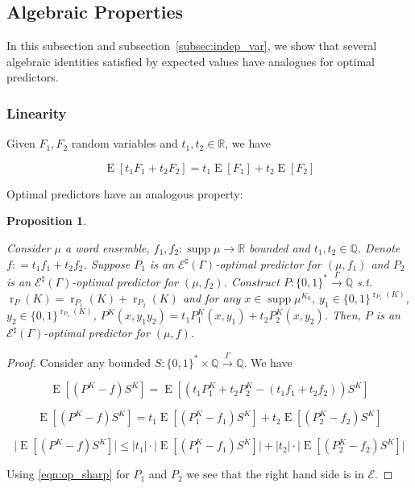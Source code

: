 \documentclass{article}
\numberwithin{equation}{section}
\theoremstyle{definition}
\theoremstyle{plain}
\newtheorem{proposition}{Proposition}[section]
\newcommand{\Bool}{\{0,1\}}
\newcommand{\Words}{{\Bool^*}}
\newcommand{\WordsLen}[1]{{\Bool^{#1}}}
\DeclareMathOperator{\Supp}{supp}
\DeclareMathOperator{\E}{E}
\DeclareMathOperator{\R}{r}
\newcommand{\Rats}{\mathbb{Q}}
\newcommand{\Reals}{\mathbb{R}}
\newcommand{\Abs}[1]{\lvert #1 \rvert}
\newcommand{\Fall}{\mathcal{E}}
\newcommand{\ESG}{\Fall^\sharp(\Gamma)}
\newcommand{\Scheme}{\xrightarrow{\Gamma}}
\begin{document}
\subsection{Algebraic Properties}

In this subsection and subsection~\ref{subsec:indep_var}, we show that several algebraic identities satisfied by expected values have analogues for optimal predictors.

\subsubsection{Linearity}

Given $F_1,F_2$ random variables and $t_1,t_2 \in \Reals$, we have 

\begin{equation}
\E[t_1 F_1 + t_2 F_2] = t_1 \E[F_1] + t_2 \E[F_2]
\end{equation}

Optimal predictors have an analogous property:

\begin{proposition}
\label{prp:linearity}

Consider $\mu$ a word ensemble, $f_1,f_2: \Supp \mu \rightarrow \Reals$ bounded and $t_1,t_2 \in \Rats$. Denote $f: = t_1 f_1 + t_2 f_2$. Suppose $P_1$ is an $\ESG$-optimal predictor for $(\mu,f_1)$ and $P_2$ is an $\ESG$-optimal predictor for $(\mu,f_2)$. Construct $P: \Words \Scheme \Rats$ s.t. $\R_P(K) = \R_{P_1}(K) + \R_{P_2}(K)$ and for any $x \in \Supp \mu^{K_0}$, $y_1 \in \WordsLen{\R_{P_1}(K)}$, $y_2 \in \WordsLen{\R_{P_1}(K)}$, $P^{K}(x,y_1 y_2)=t_1 P_1^{K}(x,y_1) + t_2 P_2^{K}(x, y_2)$. Then, $P$ is an $\ESG$-optimal predictor for $(\mu, f)$.

\end{proposition}

\begin{proof}

Consider any bounded $S: \Words \times \Rats \Scheme \Rats$. We have

$$\E[(P^{K} - f)S^{K}] = \E[(t_1 P_1^{K} + t_2 P_2^{K} - (t_1 f_1 + t_2 f_2))S^{K}]$$

$$\E[(P^{K} - f)S^{K}] = t_1 \E[(P_1^{K} - f_1)S^{K}] + t_2 \E[(P_2^{K} - f_2)S^{K}]$$

$$\Abs{\E[(P^{K} - f)S^{K}]} \leq \Abs{t_1} \cdot \Abs{\E[(P_1^{K} - f_1)S^{K}]} + \Abs{t_2} \cdot \Abs{\E[(P_2^{K} - f_2)S^{K}]}$$

Using \ref{eqn:op_sharp} for $P_1$ and $P_2$ we see that the right hand side is in $\Fall$.
\end{proof}
\end{document}
